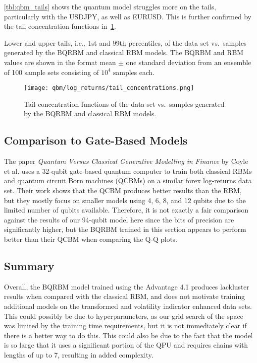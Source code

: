 \cref{tbl:qbm_tails} shows the quantum model struggles more on the tails, particularly with the USDJPY, as well as EURUSD.
This is further confirmed by the tail concentration functions in~\cref{fig:qbm_log_returns_tail_concentrations}.
\begin{table}[!htb]
    \centering
    \begin{adjustbox}{max width=\textwidth}
        
    \end{adjustbox}
    \caption{
        Lower and upper tails, i.e., 1st and 99th percentiles, of the data set vs.~samples generated by the BQRBM and classical RBM models.
        The BQRBM and RBM values are shown in the format mean \(\pm\) one standard deviation from an ensemble of 100 sample sets consisting of \( 10^4 \) samples each.
    }
    \label{tbl:qbm_tails}
\end{table}

\begin{figure}[!htb]
    \begin{center}
        \texttt{[image: qbm/log\_returns/tail\_concentrations.png]}
    \end{center}
    \caption{Tail concentration functions of the data set vs.~samples generated by the BQRBM and classical RBM models.}
    \label{fig:qbm_log_returns_tail_concentrations}
\end{figure}

\subsection{Comparison to Gate-Based Models}
The paper \textit{Quantum Versus Classical Generative Modelling in Finance} by Coyle et al. uses a 32-qubit gate-based quantum computer to train both classical RBMs and quantum circuit Born machines (QCBMs) on a similar forex log-returns data set.
Their work shows that the QCBM produces better results than the RBM, but they mostly focus on smaller models using 4, 6, 8, and 12 qubits due to the limited number of qubits available.
Therefore, it is not exactly a fair comparison against the results of our 94-qubit model here since the bits of precision are significantly higher, but the BQRBM trained in this section appears to perform better than their QCBM when comparing the Q-Q plots.

\subsection{Summary}
Overall, the BQRBM model trained using the Advantage 4.1 produces lackluster results when compared with the classical RBM, and does not motivate training additional models on the transformed and volatility indicator enhanced data sets.
This could possibly be due to hyperparameters, as our grid search of the space was limited by the training time requirements, but it is not immediately clear if there is a better way to do this.
This could also be due to the fact that the model is so large that it uses a significant portion of the QPU and requires chains with lengths of up to 7, resulting in added complexity.

